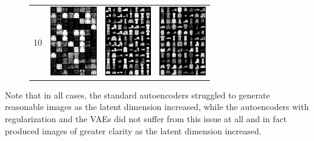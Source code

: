 \documentclass[conference]{IEEEtran}
\begin{document}
\begin{figure}[H]
\begin{tabular}{cccc}
                10 &
                \includegraphics[width=2cm]{fig/fashion-10-false.png}&
		\includegraphics[width=2cm]{fig/fashion-10-true.png}&
                \includegraphics[width=2cm]{fig/fashion-10-vae.png}
	\end{tabular}
\end{figure}

Note that in all cases, the standard autoencoders struggled to generate reasonable images as the latent dimension increased, while the autoencoders with regularization and the VAEs did not suffer from this issue at all and in fact produced images of greater clarity as the latent dimension increased.

\nocite{ae-survey}



\end{document}
